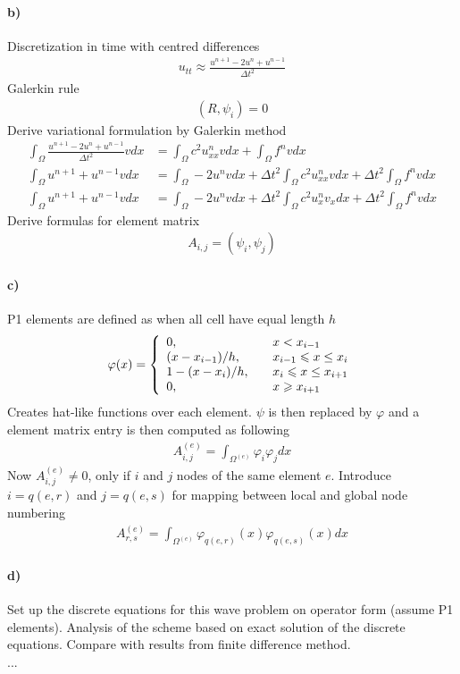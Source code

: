 \documentclass[11pt,a4paper]{article}
\begin{document}
\paragraph*{b)}
Discretization in time with centred differences
\begin{align}
u_{tt} \approx \frac{u^{n+1}-2u^{n}+u^{n-1}}{\Delta t^2}
\end{align}
Galerkin rule
\begin{align}
(R,\psi_i)=0
\end{align}
Derive variational formulation by Galerkin method
\begin{align*}
\int_\Omega \frac{u^{n+1}-2u^{n}+u^{n-1}}{\Delta t^2}vdx &= \int_\Omega c^2u^n_{xx}vdx + \int_\Omega f^nvdx \\
\int_\Omega u^{n+1}+u^{n-1}vdx &=\int_\Omega-2u^{n}vdx+ \Delta t^2\int_\Omega c^2u^n_{xx}vdx + \Delta t^2\int_\Omega f^nvdx\\
\int_\Omega u^{n+1}+u^{n-1}vdx &=\int_\Omega-2u^{n}vdx+ \Delta t^2\int_\Omega c^2u^n_{x}v_{x}dx + \Delta t^2\int_\Omega f^nvdx
\end{align*}
Derive formulas for element matrix
\begin{align}
A_{i,j} = (\psi_i,\psi_j)
\end{align}

\paragraph*{c)}
P1 elements are defined as when all cell have equal length $h$
\begin{equation}
\varphi(x) = \left\{ 
  \begin{array}{l l}
    0, & \quad x<x_{i-1}\\
    (x-x_{i-1})/h, & \quad x_{i-1}\leqslant x \leq x_{i}\\
    1-(x-x_{i})/h, & \quad x_{i}\leqslant x \leq x_{i+1}\\
    0, & \quad x\geqslant x_{i+1}
  \end{array} \right.
\end{equation}
Creates hat-like functions over each element. $\psi$ is then replaced by $\varphi$ and a element matrix entry is then computed as following
\begin{align}
A^{(e)}_{i,j}= \int_{\Omega^{(e)}} \varphi_i \varphi_j dx
\end{align}
Now $A^{(e)}_{i,j}\neq0$, only if $i$ and $j$ nodes of the same element $e$. Introduce $i = q(e,r)$ and $j = q(e,s)$ for mapping between local and global node numbering
\begin{align}
A^{(e)}_{r,s}= \int_{\Omega^{(e)}} \varphi_{q(e,r)}(x) \varphi_{q(e,s)}(x) dx
\end{align}

\paragraph*{d)}
Set up the discrete equations for this wave problem on operator form (assume P1 elements). Analysis of the scheme based on exact solution of the discrete equations. Compare with results from finite difference method. \\

...
\end{document}
